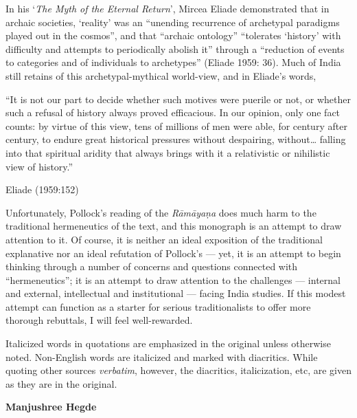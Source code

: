 In his ‘{\sl The Myth of the Eternal Return}’, Mircea Eliade demonstrated that in archaic societies, ‘reality’ was an “unending recurrence of archetypal paradigms played out in the cosmos”, and that “archaic ontology” “tolerates ‘history’ with difficulty and attempts to periodically abolish it” through a “reduction of events to categories and of individuals to archetypes” (Eliade 1959: 36). Much of India still retains of this archetypal-mythical world-view, and in Eliade’s words,  

\begin{myquote}
“It is not our part to decide whether such motives were puerile or not, or whether such a refusal of history always proved efficacious. In our opinion, only one fact counts: by virtue of this view, tens of millions of men were able, for century after century, to endure great historical pressures without despairing, without… falling into that spiritual aridity that always brings with it a relativistic or nihilistic view of history.”

\hfill Eliade (1959:152)
\end{myquote}

Unfortunately, Pollock’s reading of the {\sl Rāmāyaṇa} does much harm to the traditional hermeneutics of the text, and this monograph is an attempt to draw attention to it. Of course, it is neither an ideal exposition of the traditional explanative nor an ideal refutation of Pollock’s --- yet, it is an attempt to begin thinking through a number of concerns and questions connected with “hermeneutics”; it is an attempt to draw attention to the challenges --- internal and external, intellectual and institutional --- facing India studies. If this modest attempt can function as a starter for serious traditionalists to offer more thorough rebuttals, I will feel well-rewarded. 

Italicized words in quotations are emphasized in the original unless otherwise noted. Non-English words are italicized and marked with diacritics. While quoting other sources {\sl verbatim}, however, the diacritics, italicization, etc, are given as they are in the original. 

\bigskip
\hfill {\bf Manjushree Hegde}

